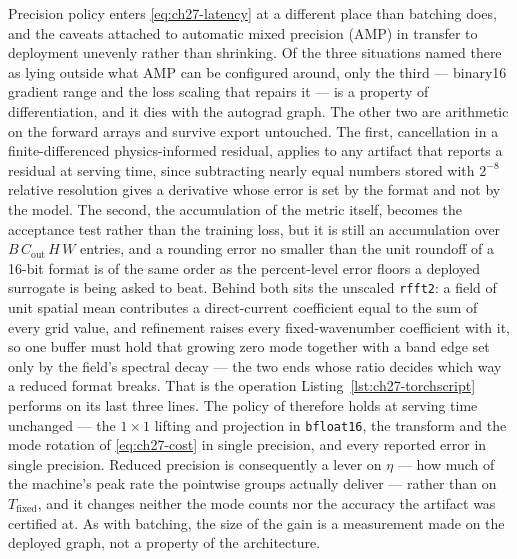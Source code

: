 Precision policy enters \eqref{eq:ch27-latency} at a different place than batching
does, and the caveats attached to automatic mixed precision (AMP) in
 transfer to
deployment unevenly rather than shrinking. Of the three situations named there as
lying outside what AMP can be configured around, only the third --- binary16
gradient range and the loss scaling that repairs it --- is a property of
differentiation, and it dies with the autograd graph. The other two are arithmetic
on the forward arrays and survive export untouched. The first, cancellation in a
finite-differenced physics-informed residual, applies to any artifact that reports a
residual at serving time, since subtracting nearly equal numbers stored with
$2^{-8}$ relative resolution gives a derivative whose error is set by the format and
not by the model. The second, the accumulation of the metric itself, becomes the
acceptance test rather than the training loss, but it is still an accumulation over
$B\,C_{\mathrm{out}}\,H\,W$ entries, and a rounding error no smaller than the unit
roundoff of a 16-bit format is of the same order as the percent-level error floors a
deployed surrogate is being asked to beat.
Behind both sits the unscaled \texttt{rfft2}: a field of unit spatial mean
contributes a direct-current coefficient equal to the sum of every grid value, and
refinement raises every fixed-wavenumber coefficient with it, so one buffer must
hold that growing zero mode together with a band edge set only by the field's
spectral decay --- the two ends whose ratio decides which way a reduced format
breaks. That is the operation Listing~\ref{lst:ch27-torchscript} performs on
its last three lines. The policy of 
therefore holds at serving time unchanged --- the $1\times1$ lifting and projection in
\texttt{bfloat16}, the transform and the mode rotation of \eqref{eq:ch27-cost} in
single precision, and every reported error in single precision. Reduced precision is
consequently a lever on $\eta$ --- how much of the machine's peak rate the pointwise
groups actually deliver --- rather than on $T_{\mathrm{fixed}}$, and it changes
neither the mode counts nor the accuracy the artifact was certified at. As with
batching, the size of the gain is a measurement made on the deployed graph, not a
property of the architecture.

